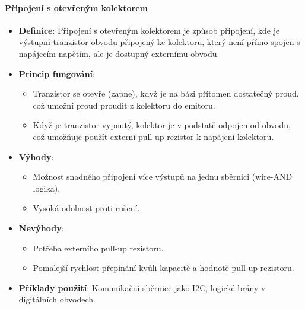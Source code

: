 \paragraph{Připojení s otevřeným kolektorem}
\begin{itemize}
    \item \textbf{Definice}: Připojení s otevřeným kolektorem je způsob připojení, kde je výstupní tranzistor obvodu připojený ke kolektoru, který není přímo spojen s napájecím napětím, ale je dostupný externímu obvodu.
    \item \textbf{Princip fungování}:
    \begin{itemize}
        \item Tranzistor se otevře (zapne), když je na bázi přítomen dostatečný proud, což umožní proud proudit z kolektoru do emitoru.
        \item Když je tranzistor vypnutý, kolektor je v podstatě odpojen od obvodu, což umožňuje použít externí pull-up rezistor k napájení kolektoru.
    \end{itemize}
    \item \textbf{Výhody}:
    \begin{itemize}
        \item Možnost snadného připojení více výstupů na jednu sběrnici (wire-AND logika).
        \item Vysoká odolnost proti rušení.
    \end{itemize}
    \item \textbf{Nevýhody}:
    \begin{itemize}
        \item Potřeba externího pull-up rezistoru.
        \item Pomalejší rychlost přepínání kvůli kapacitě a hodnotě pull-up rezistoru.
    \end{itemize}
    \item \textbf{Příklady použití}: Komunikační sběrnice jako I2C, logické brány v digitálních obvodech.
\end{itemize}

